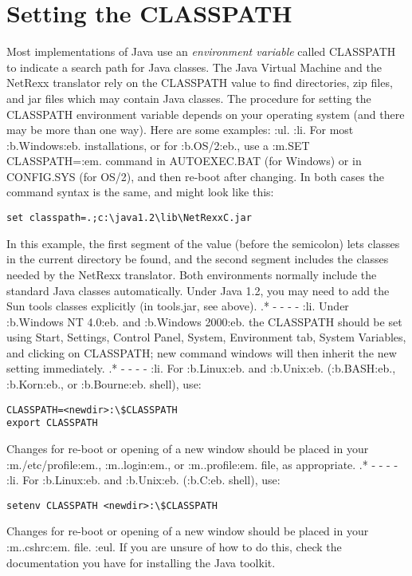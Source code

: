 \chapter{Setting the CLASSPATH}
Most implementations of Java use an \emph{environment variable} called
CLASSPATH to indicate a search path for Java classes.  The Java Virtual
Machine and the NetRexx translator rely on the CLASSPATH value to find
directories, zip files, and jar files which may contain Java classes.
\newline
The procedure for setting the CLASSPATH environment variable depends on
your operating system (and there may be more than one way).  Here are
some examples:
:ul.
:li.
For most :b.Windows:eb. installations, or for :b.OS/2:eb., use a :m.SET
CLASSPATH=:em. command in AUTOEXEC.BAT (for Windows) or in CONFIG.SYS
(for OS/2), and then re-boot after changing.  In both cases the command
syntax is the same, and might look like this:
\begin{verbatim}
set classpath=.;c:\java1.2\lib\NetRexxC.jar
\end{verbatim}
In this example, the first segment of the value (before the semicolon)
lets classes in the current directory be found, and the second segment
includes the classes needed by the NetRexx translator.  Both
environments normally include the standard Java classes automatically.
Under Java 1.2, you may need to add the Sun tools classes explicitly (in
tools.jar, see above).
.* - - - -
:li.
Under :b.Windows NT 4.0:eb. and :b.Windows 2000:eb. the CLASSPATH should
be set using Start, Settings, Control Panel, System, Environment tab,
System Variables, and clicking on CLASSPATH; new command windows will
then inherit the new setting immediately.
.* - - - -
:li.
For :b.Linux:eb. and :b.Unix:eb. (:b.BASH:eb., :b.Korn:eb., or
:b.Bourne:eb. shell), use:
\begin{verbatim}
CLASSPATH=<newdir>:\$CLASSPATH
export CLASSPATH
\end{verbatim}
Changes for re-boot or opening of a new window should be placed
in your :m./etc/profile:em., :m..login:em., or :m..profile:em. file, as
appropriate.
.* - - - -
:li.
For :b.Linux:eb. and :b.Unix:eb.
(:b.C:eb. shell), use:
\begin{verbatim}
setenv CLASSPATH <newdir>:\$CLASSPATH
\end{verbatim}
Changes for re-boot or opening of a new window should be
placed in your :m..cshrc:em. file.
:eul.
\newline
If you are unsure of how to do this, check the documentation you have
for installing the Java toolkit.
